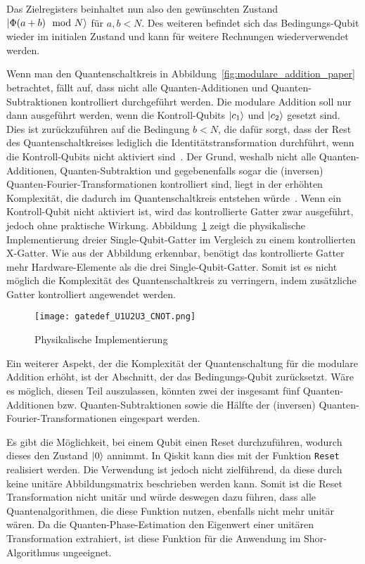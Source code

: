 Das Zielregisters beinhaltet nun also den gewünschten Zustand \(\ket{\Phi(a+b)\mod N}\) für \(a, b < N\).
Des weiteren befindet sich das Bedingungs-Qubit wieder im initialen Zustand und kann für weitere Rechnungen wiederverwendet werden.

\vspace{1em}

Wenn man den Quantenschaltkreis in Abbildung~\ref{fig:modulare_addition_paper} betrachtet,
fällt auf, 
dass nicht alle Quanten-Additionen und Quanten-Subtraktionen kontrolliert durchgeführt werden.
Die modulare Addition soll nur dann ausgeführt werden, wenn die Kontroll-Qubits \(\ket{c_1}\) und \(\ket{c_2}\) gesetzt sind.
Dies ist zurückzuführen auf die Bedingung \(b < N\), 
die dafür sorgt, dass der Rest des Quantenschaltkreises lediglich die Identitätstransformation durchführt, 
wenn die Kontroll-Qubits nicht aktiviert sind~\cite{beauregard2003circuit}.
Der Grund, weshalb nicht alle Quanten-Additionen, 
Quanten-Subtraktion und gegebenenfalls sogar die (inversen) Quanten-Fourier-Transformationen kontrolliert sind,
liegt in der erhöhten Komplexität, die dadurch im Quantenschaltkreis entstehen würde~\cite{beauregard2003circuit}.
Wenn ein Kontroll-Qubit nicht aktiviert ist, wird das kontrollierte Gatter zwar ausgeführt, jedoch ohne praktische Wirkung.
Abbildung~\ref{fig:gatedef_U1U2U3_CNOT} zeigt die physikalische Implementierung dreier Single-Qubit-Gatter im Vergleich zu einem kontrollierten X-Gatter.
Wie aus der Abbildung erkennbar, 
benötigt das kontrollierte Gatter mehr Hardware-Elemente als die drei Single-Qubit-Gatter.
Somit ist es nicht möglich die Komplexität des Quantenschaltkreis zu verringern, 
indem zusätzliche Gatter kontrolliert angewendet werden.

\begin{figure} [H]
  \caption{Physikalische Implementierung~\cite{ibmqx5}}
  \label{fig:gatedef_U1U2U3_CNOT}
  \texttt{[image: gatedef\_U1U2U3\_CNOT.png]}
  \centering
  \end{figure}

Ein weiterer Aspekt, 
der die Komplexität der Quantenschaltung für die modulare Addition erhöht, 
ist der Abschnitt, der das Bedingungs-Qubit zurücksetzt.
Wäre es möglich, diesen Teil auszulassen, könnten zwei der insgesamt fünf Quanten-Additionen bzw. 
Quanten-Subtraktionen sowie die Hälfte der (inversen) Quanten-Fourier-Transformationen eingespart werden.

Es gibt die Möglichkeit, bei einem Qubit einen Reset durchzuführen, wodurch dieses den Zustand \(\ket{0}\) annimmt.
In Qiskit kann dies mit der Funktion \texttt{Reset}~\cite{qiskitReset} realisiert werden.
Die Verwendung ist jedoch nicht zielführend, da diese durch keine unitäre Abbildungsmatrix
beschrieben werden kann.
Somit ist die Reset Transformation nicht unitär und würde deswegen dazu führen, dass alle Quantenalgorithmen, 
die diese Funktion nutzen, ebenfalls nicht mehr unitär wären.
Da die Quanten-Phase-Estimation den Eigenwert einer unitären Transformation extrahiert, 
ist diese Funktion für die Anwendung im Shor-Algorithmus ungeeignet.

